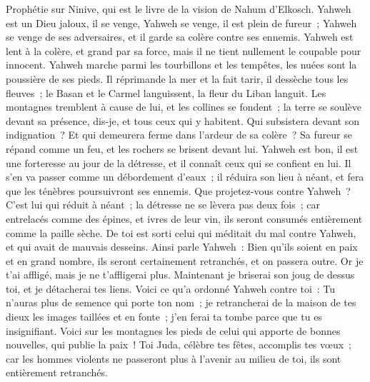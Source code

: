 \begin{multicols}{2}
\VerseOne{}Prophétie sur Ninive, qui est le livre de la vision de Nahum d'Elkosch.
Yahweh est un Dieu jaloux, il se venge, Yahweh se venge, il est plein de fureur~; Yahweh se venge de ses adversaires, et il garde sa colère contre ses ennemis.
Yahweh est lent à la colère, et grand par sa force, mais il ne tient nullement le coupable pour innocent. Yahweh marche parmi les tourbillons et les tempêtes, les nuées sont la poussière de ses pieds.
Il réprimande la mer et la fait tarir, il dessèche tous les fleuves~; le Basan et le Carmel languissent, la fleur du Liban languit.
Les montagnes tremblent à cause de lui, et les collines se fondent~; la terre se soulève devant sa présence, dis-je, et tous ceux qui y habitent.
Qui subsistera devant son indignation~? Et qui demeurera ferme dans l'ardeur de sa colère~? Sa fureur se répand comme un feu, et les rochers se brisent devant lui.
Yahweh est bon, il est une forteresse au jour de la détresse, et il connaît ceux qui se confient en lui.
Il s'en va passer comme un débordement d'eaux~; il réduira son lieu à néant, et fera que les ténèbres poursuivront ses ennemis.
Que projetez-vous contre Yahweh~? C'est lui qui réduit à néant~; la détresse ne se lèvera pas deux fois~;
car entrelacés comme des épines, et ivres de leur vin, ils seront consumés entièrement comme la paille sèche.
De toi est sorti celui qui méditait du mal contre Yahweh, et qui avait de mauvais desseins.
Ainsi parle Yahweh~: Bien qu'ils soient en paix et en grand nombre, ils seront certainement retranchés, et on passera outre. Or je t'ai affligé, mais je ne t'affligerai plus.
Maintenant je briserai son joug de dessus toi, et je détacherai tes liens.
Voici ce qu'a ordonné Yahweh contre toi~: Tu n'auras plus de semence qui porte ton nom~; je retrancherai de la maison de tes dieux les images taillées et en fonte~; j'en ferai ta tombe parce que tu es insignifiant.
\VerseOne{}Voici sur les montagnes les pieds de celui qui apporte de bonnes nouvelles, qui publie la paix~! Toi Juda, célèbre tes fêtes, accomplis tes vœux~; car les hommes violents ne passeront plus à l'avenir au milieu de toi, ils sont entièrement retranchés.

\end{multicols}

